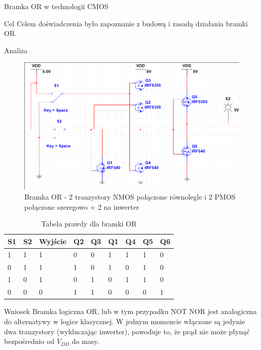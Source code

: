 \documentclass[a4paper]{scrartcl}
\begin{document}
	\clearpage
	\begin{section}{Bramka OR w technologii CMOS}
		\begin{subsection}{Cel}
			Celem doświadczenia było zapoznanie z budową i zasadą działania bramki OR.
		\end{subsection}
		\begin{subsection}{Analiza}
				\begin{figure}[ht]
				\begin{center}
					\includegraphics[width=0.8\linewidth]{exercise-11-or-circuit}
					\caption{Bramka OR - 2 tranzystory NMOS połączone równolegle i 2 PMOS połączone szeregowo + 2 na inwerter}
					\label{fig:circuit-7-cmos}
				\end{center}
				\end{figure}
				\begin{table}[!ht]
					\begin{center}
					\caption{Tabela prawdy dla bramki OR}
					\begin{tabular}{| l | l | l | l | l | l | l | l | l |}
						\hline
						S1 & S2 & Wyjście & Q2 & Q3 & Q1 & Q4 & Q5 & Q6 \\\hline
						1 & 1 & 1 & 0 & 0 & 1 & 1 & 1 & 0 \\ \hline
						0 & 1 & 1 & 1 & 0 & 1 & 0 & 1 & 0 \\ \hline
						1 & 0 & 1 & 0 & 1 & 0 & 1 & 1 & 0 \\ \hline
						0 & 0 & 0 & 1 & 1 & 0 & 0 & 0 & 1 \\ \hline
					\end{tabular}
					\end{center}
				\end{table}
		\end{subsection}
		\begin{subsection}{Wniosek}
			Bramka logiczna OR, lub w tym przypadku NOT NOR jest analogiczna do alternatywy w logice klasycznej. W jednym momencie włączone są jedynie dwa tranzystory (wykluczając inwerter), powoduje to, że prąd nie może płynąć bezpośrednio od $ V_{DD} $ do masy.
		\end{subsection}
	\end{section}
\end{document}

